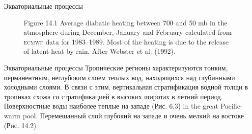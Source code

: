 \begin{chapter}{Экваториальные процессы}
\begin{figure}[b!]
\vspace{-3ex}
\caption{Figure 14.1 Average diabatic heating between
700 and 50 mb in the atmosphere during December, January and February
calculated from \textsc{ecmwf} data for 1983--1989. Most of the
heating is due to the release of latent heat by rain.  After Webster
et al. (1992).}
\label{fig:rainheat}
\end{figure}
%

\begin{section}{Экваториальные процессы}
Тропические регионы характеризуются тонким, перманентным, неглубоким
слоем теплых вод, находящихся над глубинными холодными слоями. В связи
с этим, вертикальная стратификация водной толщи в тропиках схожа со
стратификацией в высоких широтах в летний период. Поверхностные воды
наиболее теплые на западе (Рис. 6.3) in the great Pacific-warm
pool. Перемешанный слой глубокий на западе и очень мелкий на востоке
(Рис. 14.2)
%


\end{section}
\end{chapter}
